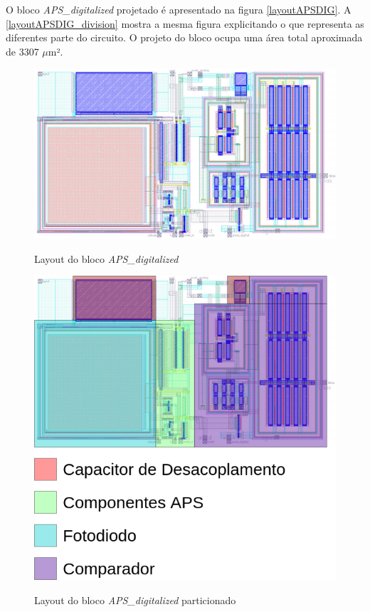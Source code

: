O bloco \textit{APS\_digitalized} projetado é apresentado na figura \autoref{layoutAPSDIG}. A \autoref{layoutAPSDIG_division} mostra a mesma figura explicitando o que representa as diferentes parte do circuito. O projeto do bloco ocupa uma área total aproximada de 3307 $\mu$m².

\begin{figure}[htb]
 \centering
    \centering
    \caption{Layout do bloco \textit{APS\_digitalized}} 
    \includegraphics[scale=0.8]{Resultados/Imagens/APS_DIGITALIZED.png}
    \label{layoutAPSDIG}
\end{figure}

\begin{figure}[htb]
 \centering
    \centering
    \caption{Layout do bloco \textit{APS\_digitalized} particionado} 
    \includegraphics[scale=0.3]{Resultados/Imagens/Image_APS_Digitalized.png}
    \label{layoutAPSDIG_division}
\end{figure}

